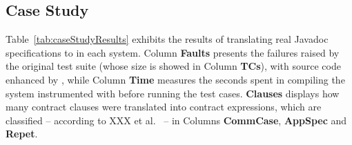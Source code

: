\subsection{Case Study}

Table~\ref{tab:caseStudyResults} exhibits the results of translating real Javadoc specifications to \contractjdoc{} in each system.
Column \textbf{Faults} presents the failures raised by the original test suite (whose size is showed in Column \textbf{TCs}), with source code enhanced by \contractjdoc{}, while Column \textbf{Time} measures the seconds spent in compiling the system instrumented with \contractjdoc{} before running the test cases. 
\textbf{Clauses} displays how many contract clauses were translated into contract expressions, which are classified -- according to XXX et al.~\cite{typeContracts} -- in Columns \textbf{CommCase}, \textbf{AppSpec} and \textbf{Repet}.

